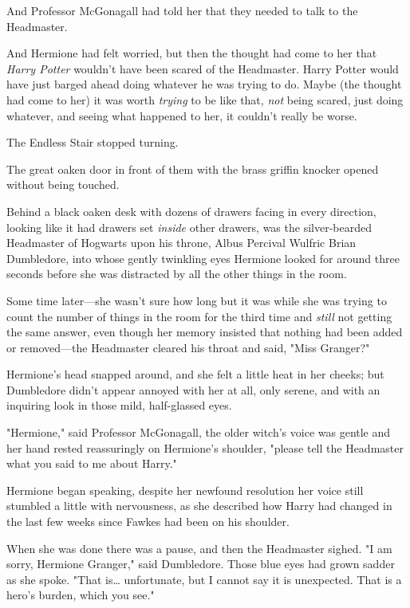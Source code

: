 And Professor McGonagall had told her that they needed to talk to the 
Headmaster.

And Hermione had felt worried, but then the thought had come to her that 
\emph{Harry Potter} wouldn't have been scared of the Headmaster. Harry Potter 
would have just barged ahead doing whatever he was trying to do. Maybe (the 
thought had come to her) it was worth \emph{trying} to be like that, \emph{not} 
being scared, just doing whatever, and seeing what happened to her, it couldn't 
really be worse.

The Endless Stair stopped turning.

The great oaken door in front of them with the brass griffin knocker opened 
without being touched.

Behind a black oaken desk with dozens of drawers facing in every direction, 
looking like it had drawers set \emph{inside} other drawers, was the 
silver-bearded Headmaster of Hogwarts upon his throne, Albus Percival Wulfric 
Brian Dumbledore, into whose gently twinkling eyes Hermione looked for around 
three seconds before she was distracted by all the other things in the room.

Some time later---she wasn't sure how long but it was while she was trying to 
count the number of things in the room for the third time and \emph{still} not 
getting the same answer, even though her memory insisted that nothing had been 
added or removed---the Headmaster cleared his throat and said, "Miss Granger?"

Hermione's head snapped around, and she felt a little heat in her cheeks; but 
Dumbledore didn't appear annoyed with her at all, only serene, and with an 
inquiring look in those mild, half-glassed eyes.

"Hermione," said Professor McGonagall, the older witch's voice was gentle and 
her hand rested reassuringly on Hermione's shoulder, "please tell the 
Headmaster what you said to me about Harry."

Hermione began speaking, despite her newfound resolution her voice still 
stumbled a little with nervousness, as she described how Harry had changed in 
the last few weeks since Fawkes had been on his shoulder.

When she was done there was a pause, and then the Headmaster sighed. "I am 
sorry, Hermione Granger," said Dumbledore. Those blue eyes had grown sadder as 
she spoke. "That is{\ldots} unfortunate, but I cannot say it is unexpected. 
That is a hero's burden, which you see."


